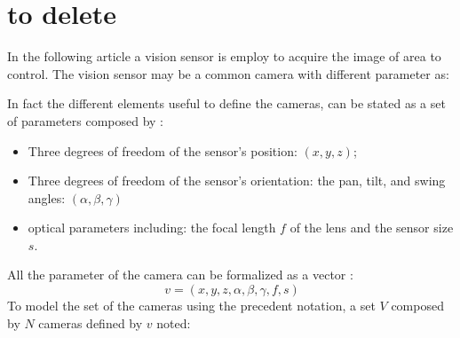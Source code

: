 \section*{ to delete}
 In the following article a vision sensor is employ to acquire the image of area to control. The vision sensor may be a common camera with different parameter as:
% 

In fact the different elements useful to define the cameras, can be stated as a set of parameters composed by :\\
\begin{itemize}
\item Three degrees of freedom of the sensor’s position: $(x, y, z)$;
\item Three degrees of freedom of the sensor’s orientation: the pan, tilt, and swing angles: $(\alpha,\beta, \gamma)$ 
\item optical parameters including: the focal length $f$ of the lens and the sensor size $s$.
\end{itemize}
All the parameter of the camera can be formalized as a vector :
\begin{equation}\
v=(x,y,z,\alpha ,\beta,\gamma,f,s)
\end{equation}
To model the set of the cameras using the precedent notation, a set $V$ composed by $N$ cameras defined by $v$ noted:

